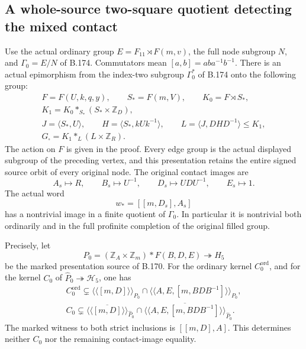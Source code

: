 \subsection*{A whole-source two-square quotient detecting the mixed contact}
\label{stmt:B175}
Use the actual ordinary group \(E=F_{11}\rtimes F(m,v)\), the full
node subgroup \(N\), and \(\Gamma _0=E/N\) of B.174.
Commutators mean \([a,b]=aba^{-1}b^{-1}\).
There is an actual epimorphism from the index-two subgroup
\(\Gamma _0^*\) of B.174 onto the following group:
\begin{equation}\label{eq:B175-whole-target}
\begin{gathered}
 F=F(U,k,q,y),\qquad S_*=F(m,V),\qquad K_0=F\rtimes S_*,\\
 K_1=K_0*_{S_*}(S_*\times\mathbb Z_D),\\
 J=\langle S_*,U\rangle,\qquad
 H=\langle S_*,kUk^{-1}\rangle,\qquad
 L=\langle J,DHD^{-1}\rangle\le K_1,\\
 G_\square=K_1*_{L}(L\times\mathbb Z_R).
\end{gathered}
\end{equation}
The action on \(F\) is given in the proof. Every edge group is the
actual displayed subgroup of the preceding vertex, and this presentation
retains the entire signed source orbit of every original node.
The original contact images are
\begin{equation}\label{eq:B175-contact-images}
 A_s\longmapsto R,\qquad B_s\longmapsto U^{-1},\qquad
 D_s\longmapsto UDU^{-1},\qquad E_s\longmapsto1.
\end{equation}
The actual word
\[
                 w_*=[[m,D_s],A_s]
\]
has a nontrivial image in a finite quotient of \(\Gamma _0\).
In particular it is nontrivial both ordinarily and in the full profinite
completion of the original filled group.

Precisely, let
\[
 P_0=(\mathbb Z_A\times\mathbb Z_m)*F(B,D,E)
                   \twoheadrightarrow H_5
\]
be the marked presentation source of B.170. For the ordinary kernel
\(C_0^{\mathrm{ord}}\), and for the kernel \(C_0\) of
\(\widehat P_0\twoheadrightarrow\mathcal H_5\), one has
\begin{equation}\label{eq:B175-strict-joint-bound}
\begin{gathered}
 C_0^{\mathrm{ord}}\subsetneq
   \langle\!\langle[m,D]\rangle\!\rangle_{P_0}
   \cap\langle\!\langle A,E,[m,BDB^{-1}]\rangle\!\rangle_{P_0},\\
 C_0\subsetneq
   \overline{\langle\!\langle[m,D]\rangle\!\rangle}_{\widehat P_0}
   \cap\overline{\langle\!\langle A,E,[m,BDB^{-1}]
                         \rangle\!\rangle}_{\widehat P_0}.
\end{gathered}
\end{equation}
The marked witness to both strict inclusions is \([[m,D],A]\).
This determines neither \(C_0\) nor the remaining contact-image equality.

